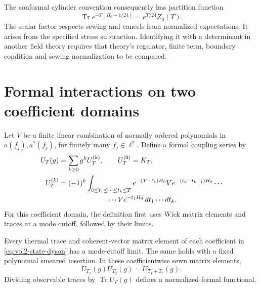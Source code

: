 The conformal cylinder convention consequently has partition function
\[
 \operatorname{Tr}e^{-T(H_0-1/24)}=e^{T/24}Z_0(T).
\]
The scalar factor respects sewing and cancels from normalized
expectations. It arises from the specified stress subtraction.
Identifying it with a determinant in another field theory requires
that theory's regulator, finite term, boundary condition and sewing
normalization to be compared.

\section{Formal interactions on two coefficient domains}

Let \(V\) be a finite linear combination of normally ordered
polynomials in \(a(f_j),a^*(f_j)\), for finitely many
\(f_j\in\ell^2\). Define a formal coupling series by
\begin{equation}\label{eq:vol2-state-dyson}
 \begin{split}
 U_T(g)&=\sum_{k\geq0}g^k U_T^{(k)},\qquad U_T^{(0)}=K_T,\\
 U_T^{(k)}&=(-1)^k\int_{0\leq t_1\leq\cdots\leq t_k\leq T}
 e^{-(T-t_k)H_0}V e^{-(t_k-t_{k-1})H_0}\cdots\\
 &\hspace{24mm}\cdots V e^{-t_1H_0}\,dt_1\cdots dt_k.
 \end{split}
\end{equation}
For this coefficient domain, the definition first uses Wick matrix
elements and traces at a mode cutoff, followed by their limits.

\begin{proposition}\label{prop:vol2-smeared-dyson}
Every thermal trace and coherent-vector matrix element of each
coefficient in \eqref{eq:vol2-state-dyson} has a mode-cutoff limit.
The same holds with a fixed polynomial smeared insertion.
In these coefficientwise sewn matrix elements,
\begin{equation}\label{eq:vol2-formal-state-sewing}
 U_{T_1}(g)U_{T_2}(g)=U_{T_1+T_2}(g).
\end{equation}
Dividing observable traces by \(\operatorname{Tr}U_T(g)\) defines
a normalized formal functional.
\end{proposition}

